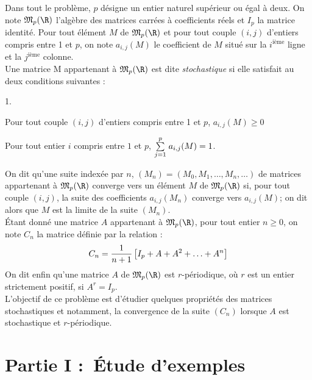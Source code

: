 \documentclass[11pt]{article}%
\begin{document}
\noindent Dans tout le problème, $p$ désigne un entier naturel
supérieur ou égal à deux. On note $\mathfrak{M}_{p}(\R)$ l'algèbre des
matrices
carrées à coefficients réels et $I_{p}$ la matrice identité. Pour tout
élément $M$ de $\mathfrak{M}_{p}(\R)$ et pour tout couple $(i,j)$
d'entiers compris entre 1 et $p$, on note $a_{i,j}(M)$ le coefficient
de $M$
situé sur la $i^{\text{ième}}$ ligne et la $j^{\text{ième}}$ colonne.\\
Une matrice M appartenant à $\mathfrak{M}_{p}(\R)$ est dite
\emph{stochastique} si elle satisfait au deux conditions suivantes :

\begin{noliste}{1.}
 \setlength{\itemsep}{4mm}
\item Pour tout couple $(i,j)$ d'entiers compris entre 1 et $p$,
$a_{i,j}(M)\geq 0$

\item Pour tout entier $i$ compris entre $1$ et $p$, ${\textstyle\sum\limits_{j =
1}^{p}}\hspace{.1cm}a_{i,j}(M) = 1$.
\end{noliste}

\noindent On dit qu'une suite indexée par $n$, $(M_{n}) =
(M_{0},M_{1},\ldots,M_{n},\ldots )$ de matrices appartenant à
$\mathfrak{M}_{p}(\R)$
converge vers un élément $M$ de $\mathfrak{M}_{p}(\R)$ si, pour tout
couple $(i,j)$, la suite des coefficients $a_{i,j}(M_{n})$ converge
vers $a_{i,j}(M)$; on dit alors que $M$ est la limite de la suite
$(M_{n})$.\\
Étant donné une matrice $A$ appartenant à $\mathfrak{M}_{p}(\R)$,
pour tout entier $n\geq 0$, on note $C_{n}$ la matrice définie par la
relation : 
\begin{equation}
C_{n} = \dfrac{1}{n + 1}\left[ I_{p} + A + A^{2} + \ldots +
A^{n}\right] \label{C_{n}}
\end{equation}On dit enfin qu'une matrice $A$ de $\mathfrak{M}_{p}(\R)$
est $r$-périodique, où $r$ est un entier strictement positif, si $A^{r}
= I_{p}$.\\
L'objectif de ce problème est d'étudier quelques propriétés des
matrices
stochastiques et notamment, la convergence de la suite $(C_{n})$
lorsque $A$
est stochastique et $r$-périodique.

\section*{Partie I :\ Étude d'exemples }
\end{document}
